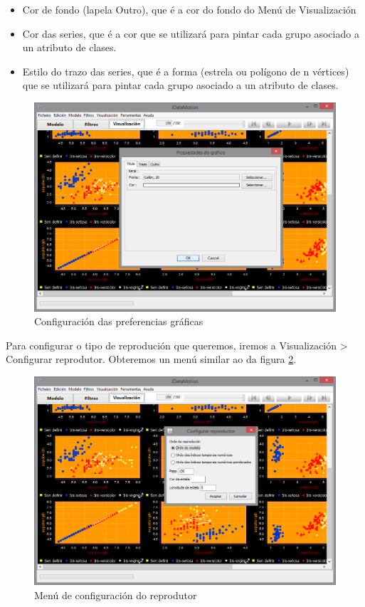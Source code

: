\begin{description}
\begin{itemize}
\item Cor de fondo (lapela Outro), que é a cor do fondo do Menú de Visualización
\item Cor das series, que é a cor que se utilizará para pintar cada grupo asociado a un atributo de clases.
\item Estilo do trazo das series, que é a forma (estrela ou polígono de n vértices) que se utilizará para pintar cada grupo asociado a un atributo de clases.
\end{itemize}
\begin{figure}
\centering
\includegraphics[width=\textwidth,height=\textheight,keepaspectratio]{figuras/propiedadesDiagramas}
\caption{Configuración das preferencias gráficas}
\label{propiedadesDiagramas}
\end{figure}
\end{description}

Para configurar o tipo de reprodución que queremos, iremos a Visualización \textgreater{} Configurar reprodutor. Obteremos un menú similar ao da figura \ref{configurarReproducion}.

\begin{figure}
\centering
\includegraphics[width=\textwidth,height=\textheight,keepaspectratio]{figuras/configurarReproducion}
\caption{Menú de configuración do reprodutor}
\label{configurarReproducion}
\end{figure}

